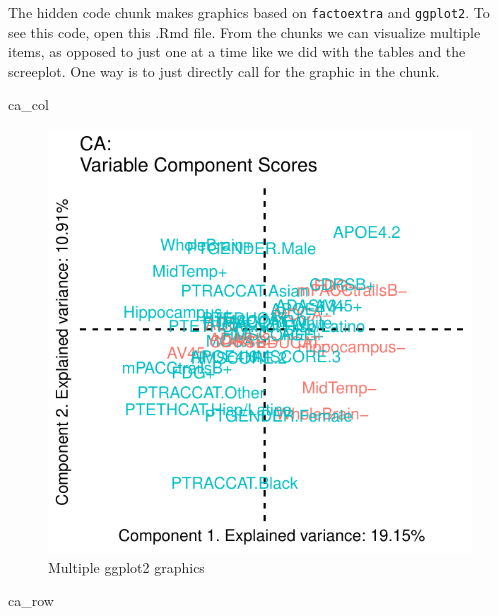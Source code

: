 \documentclass[]{article}
\newenvironment{Shaded}{\begin{snugshade}}{\end{snugshade}}
\newcommand{\NormalTok}[1]{#1}
\begin{document}
The hidden code chunk makes graphics based on \texttt{factoextra} and
\texttt{ggplot2}. To see this code, open this .Rmd file. From the chunks
we can visualize multiple items, as opposed to just one at a time like
we did with the tables and the screeplot. One way is to just directly
call for the graphic in the chunk.

\begin{Shaded}
\begin{Highlighting}[]
\NormalTok{ca_col}
\end{Highlighting}
\end{Shaded}

\begin{figure}[H]

{\centering \includegraphics{1_b_Simple_RMarkdown_PDF_files/figure-latex/unnamed-chunk-1-1} 

}

\caption{Multiple ggplot2 graphics}\label{fig:unnamed-chunk-11}
\end{figure}

\begin{Shaded}
\begin{Highlighting}[]
\NormalTok{ca_row}
\end{Highlighting}
\end{Shaded}
\end{document}
